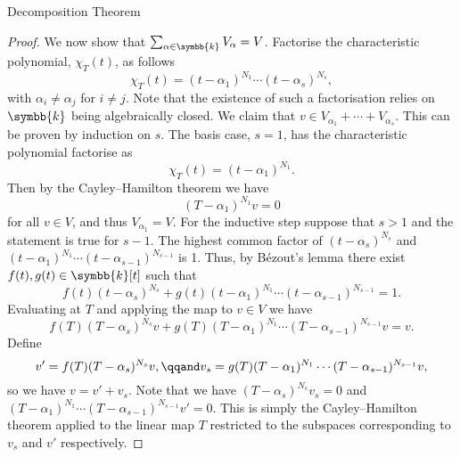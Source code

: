 \documentclass[fleqn]{NotesClass}
\renewcommand{\field}{\symbb{k}}
\begin{document}
\begin{thm}{Decomposition Theorem}{}
\begin{proof}
            We now show that \(\sum_{\alpha \in \field} V_\alpha = V\).
            Factorise the characteristic polynomial, \(\chi_T(t)\), as follows
            \begin{equation}
                \chi_T(t) = (t - \alpha_1)^{N_1} \dotsm (t - \alpha_s)^{N_s},
            \end{equation}
            with \(\alpha_i \ne \alpha_j\) for \(i \ne j\).
            Note that the existence of such a factorisation relies on \(\field\) being algebraically closed.
            We claim that \(v \in V_{\alpha_1} + \dotsb + V_{\alpha_s}\).
            This can be proven by induction on \(s\).
            The basis case, \(s = 1\), has the characteristic polynomial factorise as
            \begin{equation}
                \chi_T(t) = (t - \alpha_1)^{N_1}.
            \end{equation}
            Then by the Cayley--Hamilton theorem we have
            \begin{equation}
                (T - \alpha_1)^{N_1}v = 0
            \end{equation}
            for all \(v \in V\), and thus \(V_{\alpha_1} = V\).
            For the inductive step suppose that \(s > 1\) and the statement is true for \(s - 1\).
            The highest common factor of \((t - \alpha_s)^{N_s}\) and \((t - \alpha_1)^{N_1} \dotsm (t - \alpha_{s-1})^{N_{s-1}}\) is 1.
            Thus, by B\'ezout's lemma there exist \(f(t), g(t) \in \field[t]\) such that
            \begin{equation}
                f(t)(t - \alpha_s)^{N_s} + g(t)(t - \alpha_1)^{N_1} \dotsm (t - \alpha_{s-1})^{N_{s-1}} = 1.
            \end{equation}
            Evaluating at \(T\) and applying the map to \(v \in V\) we have
            \begin{equation}
                f(T)(T - \alpha_s)^{N_s}v + g(T)(T - \alpha_1)^{N_1} \dotsm (T - \alpha_{s-1})^{N_{s-1}}v = v.
            \end{equation}
            Define
            \begin{equation}
                v' = f(T)(T - \alpha_s)^{N_s}v, \qqand v_s = g(T)(T - \alpha_1)^{N_1} \dotsm (T - \alpha_{s-1})^{N_{s-1}}v,
            \end{equation}
            so we have \(v = v' + v_s\).
            Note that we have \((T - \alpha_s)^{N_s}v_s = 0\) and \((T - \alpha_1)^{N_1} \dotsm (T - \alpha_{s-1})^{N_{s-1}}v' = 0\).
            This is simply the Cayley--Hamilton theorem applied to the linear map \(T\) restricted to the subspaces corresponding to \(v_s\) and \(v'\) respectively.

\end{proof}
\end{thm}
\end{document}
